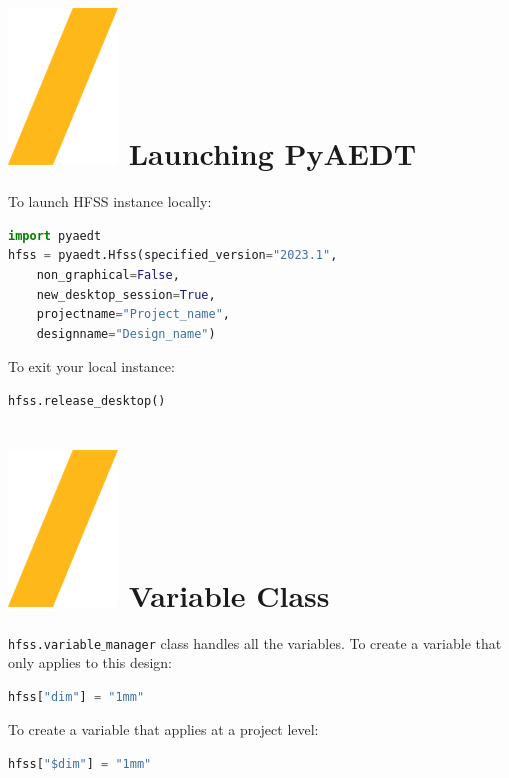 \documentclass[9pt,landscape]{article}
\begin{document}
\begin{multicols}{3}
\setlength{\premulticols}{1pt}
\setlength{\postmulticols}{1pt}
\setlength{\multicolsep}{1pt}
\setlength{\columnsep}{2pt}

\section{\includegraphics[height=\fontcharht\font`\S]{slash.png} Launching PyAEDT}
To launch HFSS instance locally:
\begin{lstlisting}[language=Python]
import pyaedt
hfss = pyaedt.Hfss(specified_version="2023.1",
	non_graphical=False,
	new_desktop_session=True,
	projectname="Project_name",
	designname="Design_name")
\end{lstlisting}
To exit your local instance:
\begin{lstlisting}[language=Python]
hfss.release_desktop()
\end{lstlisting}
\section{\includegraphics[height=\fontcharht\font`\S]{slash.png} Variable Class}
\texttt{hfss.variable$\_$manager} class handles all the variables.
\newline
To create a variable that only applies to this design:
\begin{lstlisting}[language=Python]
hfss["dim"] = "1mm"
\end{lstlisting}
To create a variable that applies at a project level:
\begin{lstlisting}[language=Python]
hfss["$dim"] = "1mm"
\end{lstlisting}

\end{multicols}
\end{document}
